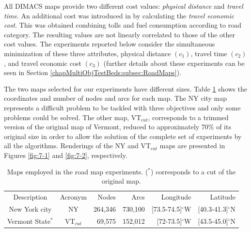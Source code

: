 All DIMACS maps provide two different cost values: \textit{physical distance} and \textit{travel time}. An additional cost was introduced in \cite{Machuca2011} by calculating the \textit{travel economic cost}. This was obtained combining tolls and fuel consumption according to road category. The resulting values are not linearly correlated to those of the other cost values. The experiments reported below consider the simultaneous minimization of these three attributes, physical distance $(c_1)$, travel time $(c_2)$, and travel economic cost $(c_3)$ (further details about these experiments can be seen in  Section \ref{chapMultiObjTestBeds:subsec:RoadMaps}). 

The two maps selected for our experiments have different sizes. Table \ref{tab:7-1} shows the coordinates and number of nodes and arcs for each map. The NY city map represents a difficult problem to be tackled with three objectives and only some problems could be solved. The other map, VT$_{cut}$, corresponds to a trimmed version of the original map of Vermont, reduced to approximately 70\% of its original size in order to allow the solution of the complete set of experiments by all the algorithms. Renderings of the NY and VT$_{cut}$ maps are presented in Figures \ref{fig:7-1} and \ref{fig:7-2}, respectively.

\begin{table}
\caption{Maps employed in the road map experiments. ($^*$) corresponds to a cut of the original map.}
\label{tab:7-1}
\begin{center}
\begin{tabular}{ccrrrr}
\hline \noalign{\smallskip} 
Description & Acronym & Nodes & Arcs & Longitude & Latitude \\
\noalign{\smallskip} \hline 
New York city& NY & 264,346 & 730,100 & [73.5-74.5]$^{\circ}$W & [40.3-41.3]$^{\circ}$N \\
Vermont State$^*$ & VT$_{cut}$ & 69,575 & 152,012 & [72-73.5]$^{\circ}$W & [43.5-45.0]$^{\circ}$N \\
\hline
\end{tabular} 
\end{center}
\end{table}

